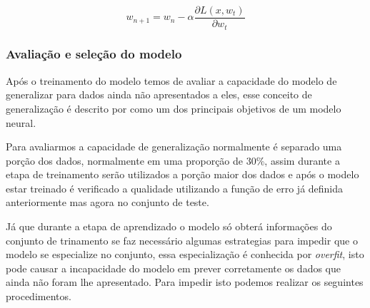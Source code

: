 \documentclass[
    12pt,
    oneside,
    a4paper,
    english,
    brazil
]{abntex2}
\begin{document}
\begin{equation}\label{eq:backpropagation}
    w_{n+1} = w_n - \alpha \frac{\partial L(x,w_t)}{\partial w_t}
\end{equation}

\subsubsection{Avaliação e seleção do modelo}

Após  o treinamento  do  modelo temos  de  avaliar a  capacidade  do modelo  de
generalizar  para  dados  ainda  não  apresentados a  eles,  esse  conceito  de
generalização  é descrito  por   como um  dos principais
objetivos de um modelo neural.

Para avaliarmos a capacidade de generalização normalmente é separado uma porção
dos  dados, normalmente  em uma  proporção de  30\%, assim  durante a  etapa de
treinamento serão  utilizados a porção  maior dos dados  e após o  modelo estar
treinado  é verificado  a qualidade  utilizando a  função de  erro já  definida
anteriormente mas agora no conjunto de teste.

Já  que durante  a  etapa de  aprendizado  o modelo  só  obterá informações  do
conjunto  de trinamento  se  faz necessário  algumas  estrategias para  impedir
que  o modelo  se  especialize  no conjunto,  essa  especialização é  conhecida
por  \textit{overfit}, isto  pode causar  a  incapacidade do  modelo em  prever
corretamente os  dados que ainda não  foram lhe apresentado. Para  impedir isto
podemos realizar os seguintes procedimentos.
\end{document}

